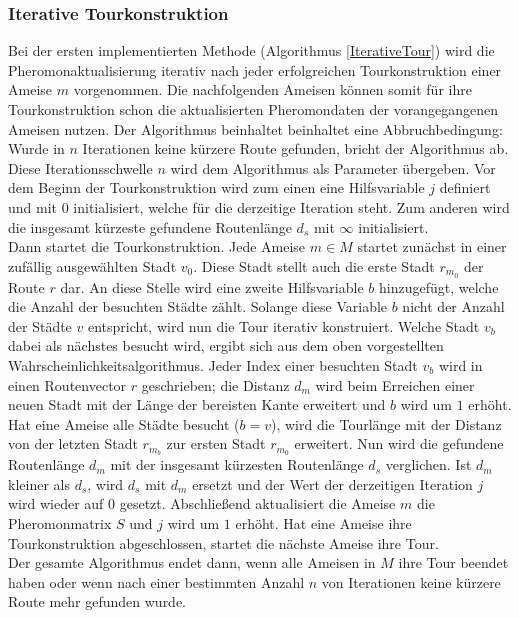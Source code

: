 \documentclass[doktyp=barbeit, sprache=german]{TUBAFarbeiten}
\begin{document}
\subsubsection{Iterative Tourkonstruktion}
Bei der ersten implementierten Methode (Algorithmus \ref{IterativeTour}) wird die Pheromonaktualisierung iterativ nach jeder erfolgreichen Tourkonstruktion einer Ameise $m$ vorgenommen. Die nachfolgenden Ameisen können somit für ihre Tourkonstruktion schon die aktualisierten Pheromondaten der vorangegangenen Ameisen nutzen. Der Algorithmus beinhaltet beinhaltet eine Abbruchbedingung: Wurde in $n$ Iterationen keine kürzere Route gefunden, bricht der Algorithmus ab. Diese Iterationsschwelle $n$ wird dem Algorithmus als Parameter übergeben. Vor dem Beginn der Tourkonstruktion wird zum einen eine Hilfsvariable $j$ definiert und mit $0$ initialisiert, welche für die derzeitige Iteration steht. Zum anderen wird die insgesamt kürzeste gefundene Routenlänge $d_s$ mit $\infty$ initialisiert. 
\\Dann startet die Tourkonstruktion. Jede Ameise $m \in M$ startet zunächst in einer zufällig ausgewählten Stadt $v_0$. Diese Stadt stellt auch die erste Stadt $r_{m_0}$ der Route $r$ dar. An diese Stelle wird eine zweite Hilfsvariable $b$ hinzugefügt, welche die Anzahl der besuchten Städte zählt. Solange diese Variable $b$ nicht der Anzahl der Städte $v$ entspricht, wird nun die Tour iterativ konstruiert. Welche Stadt $v_b$dabei als nächstes besucht wird, ergibt sich aus dem oben vorgestellten Wahrscheinlichkeitsalgorithmus. Jeder Index einer besuchten Stadt $v_b$ wird in einen Routenvector $r$ geschrieben; die Distanz $d_m$ wird beim Erreichen einer neuen Stadt mit der Länge der bereisten Kante erweitert und $b$ wird um $1$ erhöht. Hat eine Ameise alle Städte besucht ($b = v$), wird die Tourlänge mit der Distanz von der letzten Stadt $r_{m_b}$ zur ersten Stadt $r_{m_0}$ erweitert. Nun wird die gefundene Routenlänge $d_m$ mit der insgesamt kürzesten Routenlänge $d_s$ verglichen. Ist $d_m$ kleiner als $d_s$, wird $d_s$ mit $d_m$ ersetzt und der Wert der derzeitigen Iteration $j$ wird wieder auf $0$ gesetzt. Abschließend aktualisiert die Ameise $m$ die Pheromonmatrix $S$ und $j$ wird um $1$ erhöht. Hat eine Ameise ihre Tourkonstruktion abgeschlossen, startet die nächste Ameise ihre Tour.
\\Der gesamte Algorithmus endet dann, wenn alle Ameisen in $M$ ihre Tour beendet haben oder wenn nach einer bestimmten Anzahl $n$ von Iterationen keine kürzere Route mehr gefunden wurde. 
\end{document}
